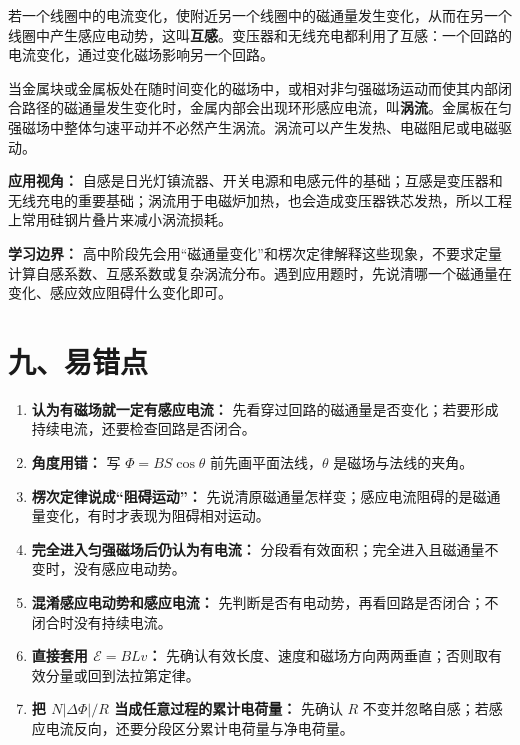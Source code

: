 若一个线圈中的电流变化，使附近另一个线圈中的磁通量发生变化，从而在另一个线圈中产生感应电动势，这叫\textbf{互感}。变压器和无线充电都利用了互感：一个回路的电流变化，通过变化磁场影响另一个回路。

\begin{center}


\label{fig:mutual-induction-coils}
\end{center}

当金属块或金属板处在随时间变化的磁场中，或相对非匀强磁场运动而使其内部闭合路径的磁通量发生变化时，金属内部会出现环形感应电流，叫\textbf{涡流}。金属板在匀强磁场中整体匀速平动并不必然产生涡流。涡流可以产生发热、电磁阻尼或电磁驱动。

\begin{center}


\label{fig:self-induction-eddy-current}
\end{center}

\textbf{应用视角：} 自感是日光灯镇流器、开关电源和电感元件的基础；互感是变压器和无线充电的重要基础；涡流用于电磁炉加热，也会造成变压器铁芯发热，所以工程上常用硅钢片叠片来减小涡流损耗。

\textbf{学习边界：} 高中阶段先会用“磁通量变化”和楞次定律解释这些现象，不要求定量计算自感系数、互感系数或复杂涡流分布。遇到应用题时，先说清哪一个磁通量在变化、感应效应阻碍什么变化即可。

\section*{九、易错点}

\begin{mistakebox}
\begin{enumerate}
  \item \textbf{认为有磁场就一定有感应电流：} 先看穿过回路的磁通量是否变化；若要形成持续电流，还要检查回路是否闭合。
  \item \textbf{角度用错：} 写 $\Phi=BS\cos\theta$ 前先画平面法线，$\theta$ 是磁场与法线的夹角。
  \item \textbf{楞次定律说成“阻碍运动”：} 先说清原磁通量怎样变；感应电流阻碍的是磁通量变化，有时才表现为阻碍相对运动。
  \item \textbf{完全进入匀强磁场后仍认为有电流：} 分段看有效面积；完全进入且磁通量不变时，没有感应电动势。
  \item \textbf{混淆感应电动势和感应电流：} 先判断是否有电动势，再看回路是否闭合；不闭合时没有持续电流。
  \item \textbf{直接套用 $\mathcal E=BLv$：} 先确认有效长度、速度和磁场方向两两垂直；否则取有效分量或回到法拉第定律。
  \item \textbf{把 $N|\Delta\Phi|/R$ 当成任意过程的累计电荷量：} 先确认 $R$ 不变并忽略自感；若感应电流反向，还要分段区分累计电荷量与净电荷量。
\end{enumerate}
\end{mistakebox}

